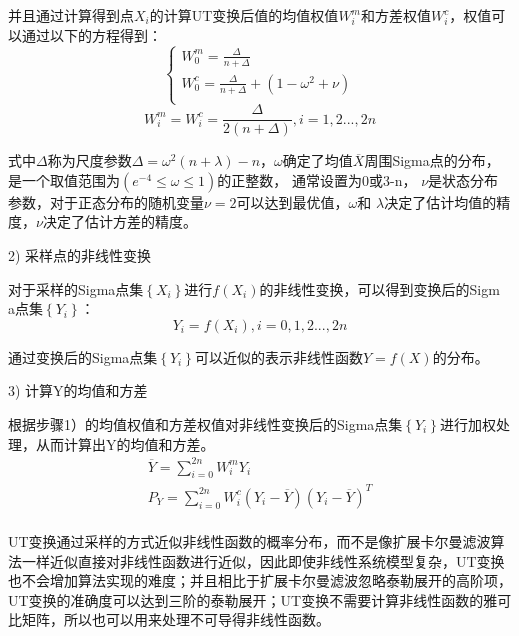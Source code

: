 并且通过计算得到点${{X}_{i}}$的计算UT变换后值的均值权值$W_{i}^{m}$和方差权值$W_{i}^{c}$，权值可以通过以下的方程得到：
\begin{equation}
\left\{ \begin{array}{l}
   W_{0}^{m}=\frac{\Delta }{n+\Delta } \\ 
  W_{0}^{c}=\frac{\Delta }{n+\Delta }+(1-{{\omega }^{2}}+\nu ) \\ 
\end{array} \right.
\end{equation}  
\begin{equation}
W_{i}^{m}=W_{i}^{c}=\frac{\Delta }{2\left( n+\Delta  \right)},i=1,2...,2n
\end{equation}

式中$\Delta $称为尺度参数$\Delta ={{\omega }^{2}}(n+\lambda )-n$，$\omega $确定了均值$\overline{X}$周围Sigma点的分布，是一个取值范围为$\left( {{e}^{-4}}\le \omega \le 1 \right)$的正整数， 通常设置为0或3-n， $\nu $是状态分布参数，对于正态分布的随机变量$\nu =2$可以达到最优值，$\omega $和 $\lambda $决定了估计均值的精度，$\nu $决定了估计方差的精度。

2) 采样点的非线性变换

	对于采样的Sigma点集$\left\{ {{X}_{i}} \right\}$进行$f\left( {{X}_{i}} \right)$的非线性变换，可以得到变换后的Sigm\\a点集$\left\{ {{Y}_{i}} \right\}$：
\begin{equation}
{{Y}_{i}}=f\left( {{X}_{i}} \right),i=0,1,2...,2n
\end{equation}

通过变换后的Sigma点集$\left\{ {{Y}_{i}} \right\}$可以近似的表示非线性函数$Y=f(X)$的分布。

3) 计算Y的均值和方差

根据步骤1）的均值权值和方差权值对非线性变换后的Sigma点集$\left\{ {{Y}_{i}} \right\}$进行加权处理，从而计算出Y的均值和方差。
\begin{equation}\label{3-28}
\begin{array}{l}
   \overline{Y}=\sum\limits_{i=0}^{2n}{W_{i}^{m}{{Y}_{i}}} \\ 
  {{P}_{Y}}=\sum\limits_{i=0}^{2n}{W_{i}^{c}({{Y}_{i}}-\overline{Y}){{({{Y}_{i}}-\overline{Y})}^{T}}} \\ 
\end{array}
\end{equation}

UT变换通过采样的方式近似非线性函数的概率分布，而不是像扩展卡尔曼滤波算法一样近似直接对非线性函数进行近似，因此即使非线性系统模型复杂，UT变换也不会增加算法实现的难度；并且相比于扩展卡尔曼滤波忽略泰勒展开的高阶项，UT变换的准确度可以达到三阶的泰勒展开；UT变换不需要计算非线性函数的雅可比矩阵，所以也可以用来处理不可导得非线性函数。


